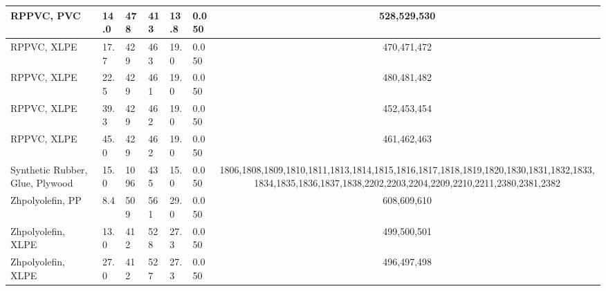 \begin{table}[!h]
\begin{tabular}{|p{4.5cm}|p{1.0cm}|p{1.0cm}|p{1.0cm}|p{1.0cm}|p{1.0cm}|c|}
$$RPPVC, PVC                                        & 14.0 & 478 & 413 & 13.8 & 0.050 & 528,529,530 \\\hline
RPPVC, XLPE                                       & 17.7 & 429 & 463 & 19.0 & 0.050 & 470,471,472 \\\hline
RPPVC, XLPE                                       & 22.5 & 429 & 461 & 19.0 & 0.050 & 480,481,482 \\\hline
RPPVC, XLPE                                       & 39.3 & 429 & 462 & 19.0 & 0.050 & 452,453,454 \\\hline
RPPVC, XLPE                                       & 45.0 & 429 & 462 & 19.0 & 0.050 & 461,462,463 \\\hline
Synthetic Rubber, Glue, Plywood                   & 15.0 & 1096 & 435 & 15.0 & 0.050 & 1806,1808,1809,1810,1811,1813,1814,1815,1816,1817,1818,1819,1820,1830,1831,1832,1833,1834,1835,1836,1837,1838,2202,2203,2204,2209,2210,2211,2380,2381,2382 \\\hline
Zhpolyolefin, PP                                  & 8.4 & 509 & 561 & 29.0 & 0.050 & 608,609,610 \\\hline
Zhpolyolefin, XLPE                                & 13.0 & 412 & 528 & 27.3 & 0.050 & 499,500,501 \\\hline
Zhpolyolefin, XLPE                                & 27.0 & 412 & 527 & 27.3 & 0.050 & 496,497,498 \\\hline
\end{tabular}
\label{Properties_RISE_Materials_Mixtures}
\end{table}


